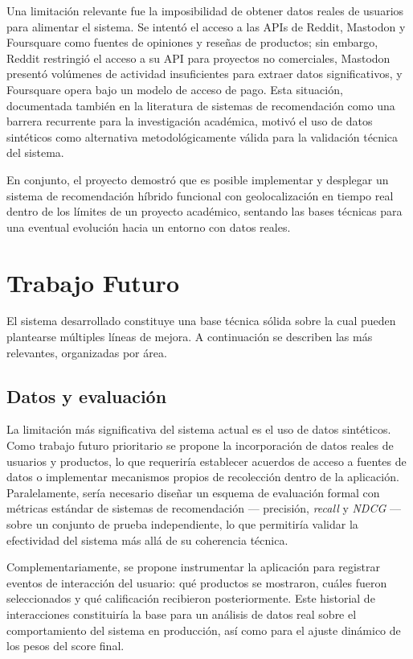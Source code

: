 \documentclass[11pt, letterpaper]{article}
\begin{document}
	Una limitación relevante fue la imposibilidad de obtener datos reales de
	usuarios para alimentar el sistema. Se intentó el acceso a las APIs de
	Reddit, Mastodon y Foursquare como fuentes de opiniones y reseñas de
	productos; sin embargo, Reddit restringió el acceso a su API para
	proyectos no comerciales, Mastodon presentó volúmenes de actividad
	insuficientes para extraer datos significativos, y Foursquare opera bajo
	un modelo de acceso de pago. Esta situación, documentada también en la
	literatura de sistemas de recomendación como una barrera recurrente para
	la investigación académica, motivó el uso de datos sintéticos como
	alternativa metodológicamente válida para la validación técnica del sistema.
	
	En conjunto, el proyecto demostró que es posible implementar y desplegar
	un sistema de recomendación híbrido funcional con geolocalización en tiempo
	real dentro de los límites de un proyecto académico, sentando las bases
	técnicas para una eventual evolución hacia un entorno con datos reales.
	
	\section{Trabajo Futuro}
	
	El sistema desarrollado constituye una base técnica sólida sobre la cual
	pueden plantearse múltiples líneas de mejora. A continuación se describen
	las más relevantes, organizadas por área.
	
	\subsection*{Datos y evaluación}
	
	La limitación más significativa del sistema actual es el uso de datos
	sintéticos. Como trabajo futuro prioritario se propone la incorporación
	de datos reales de usuarios y productos, lo que requeriría establecer
	acuerdos de acceso a fuentes de datos o implementar mecanismos propios
	de recolección dentro de la aplicación. Paralelamente, sería necesario
	diseñar un esquema de evaluación formal con métricas estándar de sistemas
	de recomendación — precisión, \textit{recall} y \textit{NDCG} — sobre un
	conjunto de prueba independiente, lo que permitiría validar la efectividad
	del sistema más allá de su coherencia técnica.
	
	Complementariamente, se propone instrumentar la aplicación para registrar
	eventos de interacción del usuario: qué productos se mostraron, cuáles
	fueron seleccionados y qué calificación recibieron posteriormente. Este
	historial de interacciones constituiría la base para un análisis de datos
	real sobre el comportamiento del sistema en producción, así como para el
	ajuste dinámico de los pesos del score final.
	
\end{document}
